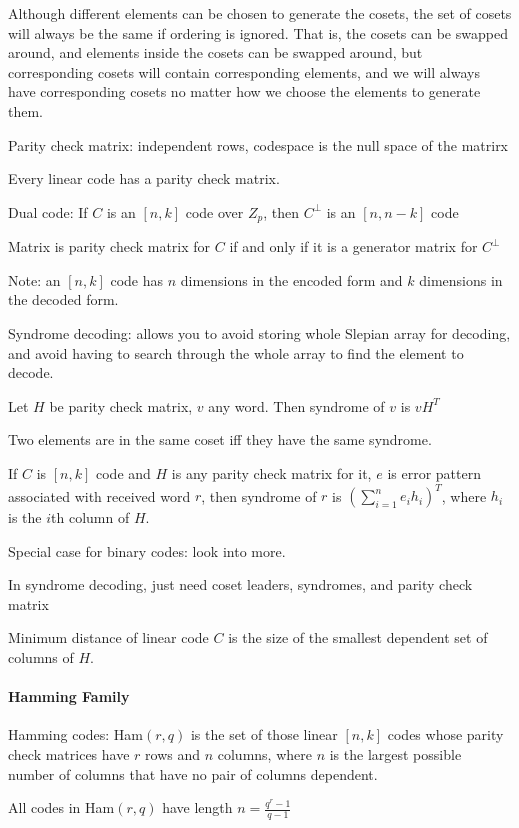 \documentclass{article}
\begin{document}
Although different elements can be chosen to generate the cosets, the set of cosets will always be the same if ordering is ignored. That is, the cosets can be swapped around, and elements inside the cosets can be swapped around, but corresponding cosets will contain corresponding elements, and we will always have corresponding cosets no matter how we choose the elements to generate them.

Parity check matrix: independent rows, codespace is the null space of the matrirx

Every linear code has a parity check matrix.

Dual code: If $C$ is an $[n,k]$ code over $Z_p$, then $C^\perp$ is an $[n, n - k]$ code

Matrix is parity check matrix for $C$ if and only if it is a generator matrix for $C^\perp$

Note: an $[n,k]$ code has $n$ dimensions in the encoded form and $k$ dimensions in the decoded form.

Syndrome decoding: allows you to avoid storing whole Slepian array for decoding, and avoid having to search through the whole array to find the element to decode.

Let $H$ be parity check matrix, $v$ any word. Then syndrome of $v$ is $vH^T$

Two elements are in the same coset iff they have the same syndrome.

If $C$ is $[n,k]$ code and $H$ is any parity check matrix for it, $e$ is error pattern associated with received word $r$, then syndrome of $r$ is $\left(\sum\limits_{i=1}^n e_i h_i\right)^T$, where $h_i$ is the $i$th column of $H$.

Special case for binary codes: look into more.

In syndrome decoding, just need coset leaders, syndromes, and parity check matrix

Minimum distance of linear code $C$ is the size of the smallest dependent set of columns of $H$.

\paragraph{Hamming Family}

Hamming codes: Ham$(r, q)$ is the set of those linear $[n, k]$ codes whose parity check matrices have $r$ rows and $n$ columns, where $n$ is the largest possible number of columns that have no pair of columns dependent.

All codes in Ham$(r, q)$ have length $n = \frac{q^r - 1}{q - 1}$
\end{document}

